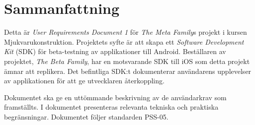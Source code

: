 \section*{Sammanfattning} %
Detta är \textit{User Requirements Document 1} för \textit{The Meta Family}s projekt i kursen Mjukvarukonstruktion. Projektets syfte är att skapa ett \textit{Software Development Kit} (SDK) för beta-testning av applikationer till Android. Beställaren av projektet, \textit{The Beta Family}, har en motsvarande SDK till iOS som detta projekt ämnar att replikera. Det befintliga SDK:t dokumenterar användarens upplevelser av applikationen för att ge utvecklaren återkoppling.

Dokumentet ska ge en uttömmande beskrivning av de användarkrav som framställts. I dokumentet presenteras relevanta tekniska och praktiska begränsningar. Dokumentet följer standarden PSS-05.
